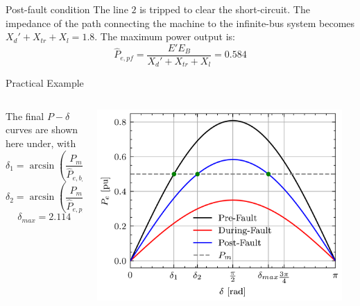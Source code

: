 \begin{frame}{Post-fault condition}
The line $2$ is tripped to clear the short-circuit.
The impedance of the path connecting the machine to the infinite-bus system becomes $X_d' + X_{tr} + X_{l} = 1.8$.
The maximum power output is:
$$\hat{P}_{e,pf} = \frac{E'E_{B}}{X_d' + X_{tr} + X_{l}} = 0.584$$
\end{frame}

\begin{frame}{Practical Example}
\begin{columns}
    \begin{column}{0.45\textwidth}
        The final $P-\delta$ curves are shown here under, with
        $$\delta_1 = \arcsin \left(\frac{P_m}{\hat{P}_{e,bf}}\right) = 0.667$$ $$\delta_2 = \arcsin \left(\frac{P_m}{\hat{P}_{e,pf}}\right) = 1.028$$ $$ \delta_{max} = 2.114$$
    \end{column}
    \begin{column}{0.55\textwidth}
        \begin{center}
        \includegraphics[width=0.95\textwidth]{images/P-delta-example.png}
        \end{center}
    \end{column}
\end{columns}


\end{frame}


